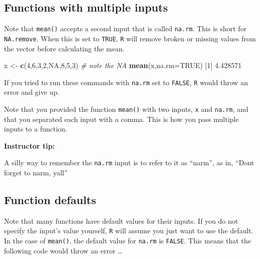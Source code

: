 \documentclass[]{book}
\newenvironment{Shaded}{\begin{snugshade}}{\end{snugshade}}
\newcommand{\CommentTok}[1]{\textcolor[rgb]{0.56,0.35,0.01}{\textit{#1}}}
\newcommand{\DataTypeTok}[1]{\textcolor[rgb]{0.13,0.29,0.53}{#1}}
\newcommand{\DecValTok}[1]{\textcolor[rgb]{0.00,0.00,0.81}{#1}}
\newcommand{\FloatTok}[1]{\textcolor[rgb]{0.00,0.00,0.81}{#1}}
\newcommand{\KeywordTok}[1]{\textcolor[rgb]{0.13,0.29,0.53}{\textbf{#1}}}
\newcommand{\NormalTok}[1]{#1}
\newcommand{\OtherTok}[1]{\textcolor[rgb]{0.56,0.35,0.01}{#1}}
\newcommand{\StringTok}[1]{\textcolor[rgb]{0.31,0.60,0.02}{#1}}
\begin{document}
\hypertarget{functions-with-multiple-inputs}{%
\subsection*{Functions with multiple inputs}\label{functions-with-multiple-inputs}}

Note that \texttt{mean()} accepts a second input that is called \texttt{na.rm}. This is short for \texttt{NA.remove}. When this is set to \texttt{TRUE}, \texttt{R} will remove broken or missing values from the vector before calculating the mean.

\begin{Shaded}
\begin{Highlighting}[]
\NormalTok{x <-}\StringTok{ }\KeywordTok{c}\NormalTok{(}\DecValTok{4}\NormalTok{,}\DecValTok{6}\NormalTok{,}\DecValTok{3}\NormalTok{,}\DecValTok{2}\NormalTok{,}\OtherTok{NA}\NormalTok{,}\DecValTok{8}\NormalTok{,}\DecValTok{5}\NormalTok{,}\DecValTok{3}\NormalTok{)  }\CommentTok{# note the NA}
\KeywordTok{mean}\NormalTok{(x,}\DataTypeTok{na.rm=}\OtherTok{TRUE}\NormalTok{)}
\NormalTok{[}\DecValTok{1}\NormalTok{] }\FloatTok{4.428571}
\end{Highlighting}
\end{Shaded}

If you tried to run these commands with \texttt{na.rm} set to \texttt{FALSE}, \texttt{R} would throw an error and give up.

Note that you provided the function \texttt{mean()} with two inputs, \texttt{x} and \texttt{na.rm}, and that you separated each input with a comma. This is how you pass multiple inputs to a function.

\leavevmode\hypertarget{tip-text}{}%
\textbf{Instructor tip:}

A silly way to remember the \texttt{na.rm} input is to refer to it as ``narm'', as in, ``Dont forget to narm, yall''

\hypertarget{function-defaults}{%
\subsection*{Function defaults}\label{function-defaults}}

Note that many functions have default values for their inputs. If you do not specify the input's value yourself, \texttt{R} will assume you just want to use the default. In the case of \texttt{mean()}, the default value for \texttt{na.rm} is \texttt{FALSE}. This means that the following code would throw an error \ldots{}
\end{document}
